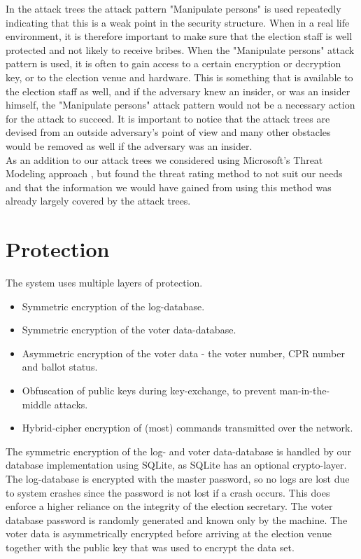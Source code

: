 \documentclass[a4paper]{report}
\begin{document}
In the attack trees the attack pattern "Manipulate persons" is used repeatedly indicating that this is a weak point in the security structure. When in a real life environment, it is therefore important to make sure that the election staff is well protected and not likely to receive bribes. When the "Manipulate persons" attack pattern is used, it is often to gain access to a certain encryption or decryption key, or to the election venue and hardware. This is something that is available to the election staff as well, and if the adversary knew an insider, or was an insider himself, the "Manipulate persons" attack pattern would not be a necessary action for the attack to succeed. It is important to notice that the attack trees are devised from an outside adversary's point of view and many other obstacles would be removed as well if the adversary was an insider. \\

As an addition to our attack trees we considered using Microsoft's Threat Modeling approach \cite{meier}, but found the threat rating method to not suit our needs and that the information we would have gained from using this method was already largely covered by the attack trees.

\section{Protection}
The system uses multiple layers of protection.
\begin{itemize}
\item Symmetric encryption of the log-database.
\item Symmetric encryption of the voter data-database.
\item Asymmetric encryption of the voter data - the voter number, CPR number and ballot status.
\item Obfuscation of public keys during key-exchange, to prevent man-in-the-middle attacks.
\item Hybrid-cipher encryption of (most) commands transmitted over the network.
\end{itemize}

The symmetric encryption of the log- and voter data-database is handled by our database implementation using SQLite, as SQLite has an optional crypto-layer. The log-database is encrypted with the master password, so no logs are lost due to system crashes since the password is not lost if a crash occurs. This does enforce a higher reliance on the integrity of the election secretary. The voter database password is randomly generated and known only by the machine. The voter data is asymmetrically encrypted before arriving at the election venue together with the public key that was used to encrypt the data set. \\
\end{document}
